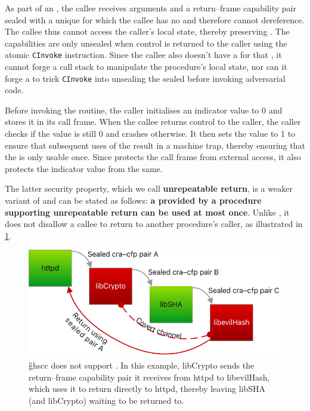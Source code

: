 \documentclass[main.tex]{subfiles}
\begin{document}
As part of an , the callee receives arguments and a return–frame capability pair sealed with a unique  for which the callee has no  and therefore cannot dereference. The callee thus cannot access the caller's local state, thereby preserving . The capabilities are only unsealed when control is returned to the caller using the atomic \texttt{CInvoke} instruction. Since the callee also doesn't have a  for that , it cannot forge a call stack to manipulate the procedure's local state, nor can it forge a  to trick \texttt{CInvoke} into unsealing the sealed  before invoking adversarial code.

Before invoking the  routine, the caller initialises an indicator value to 0 and stores it in its call frame. When the callee returns control to the caller, the caller checks if the value is still 0 and crashes otherwise. It then sets the value to 1 to ensure that subsequent uses of the  result in a machine trap, thereby ensuring that the  is only usable once. Since  protects the call frame from external access, it also protects the indicator value from the same.

The latter security property, which we call \textbf{unrepeatable return}, is a weaker variant of  and can be stated as follows: \textbf{a  provided by a procedure supporting unrepeatable return can be used at most once}. Unlike , it does not disallow a callee to return to another procedure's caller, as illustrated in \cref{fig:no-wbcf}.

\begin{figure}
	\begin{center}
		\includegraphics{Images/Semi-WBCF.pdf}
	\end{center}
	\caption{\G{ghscc} does not support . In this example, libCrypto sends the return–frame capability pair it receives from httpd to libevilHash, which uses it to return directly to httpd, thereby leaving libSHA (and libCrypto) waiting to be returned to.}
	\label{fig:no-wbcf}
\end{figure}
\end{document}
